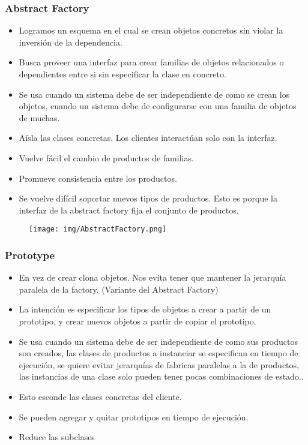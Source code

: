 \subsubsection*{Abstract Factory}
\begin{itemize}
\item Logramos un esquema en el cual se crean objetos concretos sin violar la inversión de la dependencia.
\item Busca proveer una interfaz para crear familias de objetos relacionados o dependientes entre si sin especificar la clase en concreto.
\item Se usa cuando un sistema debe de ser independiente de como se crean los objetos, cuando un sistema debe de configurarse con una familia de objetos de muchas.
\item Aísla las clases concretas. Los clientes interactúan solo con la interfaz.
\item Vuelve fácil el cambio de productos de familias.
\item Promueve consistencia entre los productos.
\item Se vuelve difícil soportar nuevos tipos de productos. Esto es porque la interfaz de la abstract factory fija el conjunto de productos.
\end{itemize}

\begin{figure}[!htb]
    \centering
    \texttt{[image: img/AbstractFactory.png]}
\end{figure}

\subsubsection*{Prototype}
\begin{itemize}
\item En vez de crear clona objetos. Nos evita tener que mantener la jerarquía paralela de la factory. (Variante del Abstract Factory)
\item La intención es especificar los tipos de objetos a crear a partir de un prototipo, y crear nuevos objetos a partir de copiar el prototipo.
\item Se usa cuando un sistema debe de ser independiente de como sus productos son creados, las clases de productos a instanciar se especifican en tiempo de ejecución, se quiere evitar jerarquías de fabricas paralelas a la de productos,  las instancias de una clase solo pueden tener pocas combinaciones de estado..
\item Esto esconde las clases concretas del cliente.
\item Se pueden agregar y quitar prototipos en tiempo de ejecución.
\item Reduce las subclases
\end{itemize}

